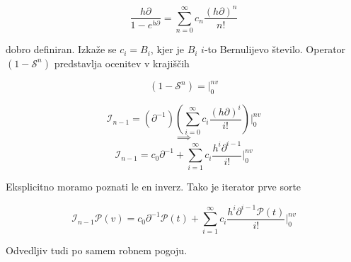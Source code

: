 \documentclass{article}
\newcommand{\Shift}{\mathcal{S}}
\newcommand{\dP}{\mathcal{P}}
\newcommand{\D}{\partial}
\begin{document}
  \begin{equation}
  	\frac{h\D}{1-e^{h\D}}=\sum\limits_{n=0}^{\infty}c_n\frac{(h\D)^n}{n!}
  \end{equation}
  
  dobro definiran. Izkaže se $c_i=B_i$, kjer je $B_i$ $i$-to Bernulijevo število. Operator $(1-\Shift^n)$ predstavlja ocenitev v krajiščih
  
  $$(1-\Shift^n)=\Bigg\vert_0^{nv}$$
  
  $$\mathcal{I}_{n-1}=(\D^{-1})(\sum\limits_{i=0}^{\infty}c_i\frac{(h\D)^i}{i!})\Bigg\vert_0^{nv}$$
  $$\implies$$
  $$\mathcal{I}_{n-1}=c_0\D^{-1}+\sum\limits_{i=1}^{\infty}c_i\frac{h^i\D^{i-1}}{i!}\Bigg\vert_0^{nv}$$
  
  Eksplicitno moramo poznati le en inverz. Tako je iterator prve sorte
  
  \begin{equation}
  	\mathcal{I}_{n-1}\dP(v)=c_0\D^{-1}\dP(t)+\sum\limits_{i=1}^{\infty}c_i\frac{h^i\D^{i-1}\dP(t)}{i!}\Bigg\vert_0^{nv}
  \end{equation}
  
  Odvedljiv tudi po samem robnem pogoju.
  
\end{document}
